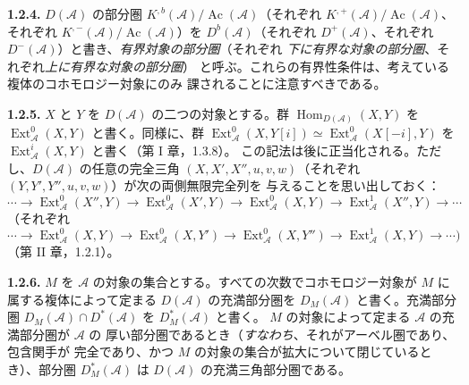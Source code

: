 \clearpage
{}%
\begingroup\small\setlength{\parskip}{0pt}\setlength{\emergencystretch}{1.5em}
\setlength{\abovedisplayskip}{4pt plus 2pt minus 2pt}%
\setlength{\belowdisplayskip}{4pt plus 2pt minus 2pt}%

\noindent\textbf{1.2.4.}\quad
$D(\mathcal A)$ の部分圏
$K^{,b}(\mathcal A)/\operatorname{Ac}(\mathcal A)$（それぞれ
$K^{,+}(\mathcal A)/\operatorname{Ac}(\mathcal A)$、それぞれ
$K^{,-}(\mathcal A)/\operatorname{Ac}(\mathcal A)$）を
$D^b(\mathcal A)$（それぞれ $D^+(\mathcal A)$、それぞれ
$D^-(\mathcal A)$）と書き、\emph{有界対象の部分圏}（それぞれ
\emph{下に有界な対象の部分圏}、それぞれ\emph{上に有界な対象の部分圏}）
と呼ぶ。これらの有界性条件は、考えている複体のコホモロジー対象にのみ
課されることに注意すべきである。

\medskip\noindent\textbf{1.2.5.}\quad
$X$ と $Y$ を $D(\mathcal A)$ の二つの対象とする。群
$\operatorname{Hom}_{D(\mathcal A)}(X,Y)$ を
$\operatorname{Ext}_{\mathcal A}^{0}(X,Y)$ と書く。同様に、群
$\operatorname{Ext}_{\mathcal A}^{0}(X,Y[i])\simeq
\operatorname{Ext}_{\mathcal A}^{0}(X[-i],Y)$ を
$\operatorname{Ext}_{\mathcal A}^{i}(X,Y)$ と書く（第 I 章，1.3.8）。
この記法は後に正当化される。ただし、$D(\mathcal A)$ の任意の完全三角
$(X,X',X'',u,v,w)$（それぞれ $(Y,Y',Y'',u,v,w)$）が次の両側無限完全列を
与えることを思い出しておく：
\[
\cdots\longrightarrow \operatorname{Ext}_{\mathcal A}^{0}(X'',Y)
\longrightarrow \operatorname{Ext}_{\mathcal A}^{0}(X',Y)
\longrightarrow \operatorname{Ext}_{\mathcal A}^{0}(X,Y)
\longrightarrow \operatorname{Ext}_{\mathcal A}^{1}(X'',Y)
\longrightarrow\cdots
\]
（それぞれ
\[
\cdots\longrightarrow \operatorname{Ext}_{\mathcal A}^{0}(X,Y)
\longrightarrow \operatorname{Ext}_{\mathcal A}^{0}(X,Y')
\longrightarrow \operatorname{Ext}_{\mathcal A}^{0}(X,Y'')
\longrightarrow \operatorname{Ext}_{\mathcal A}^{1}(X,Y)
\longrightarrow\cdots )
\]
（第 II 章，1.2.1）。

\medskip\noindent\textbf{1.2.6.}\quad
$M$ を $\mathcal A$ の対象の集合とする。すべての次数でコホモロジー対象が
$M$ に属する複体によって定まる $D(\mathcal A)$ の充満部分圏を
$D_M(\mathcal A)$ と書く。充満部分圏
$D_M(\mathcal A)\cap D^*(\mathcal A)$ を $D_M^*(\mathcal A)$ と書く。
$M$ の対象によって定まる $\mathcal A$ の充満部分圏が $\mathcal A$ の
厚い部分圏であるとき（\textit{すなわち}、それがアーベル圏であり、包含関手が
完全であり、かつ $M$ の対象の集合が拡大について閉じているとき）、部分圏
$D_M^*(\mathcal A)$ は $D(\mathcal A)$ の充満三角部分圏である。

